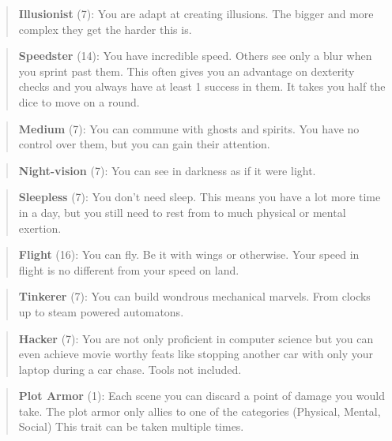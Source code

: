 \documentclass[11pt]{article}
\begin{document}
{\begin{multicols}{2}[]
\begin{quote}
\textbf{Illusionist} (7): You are adapt at creating illusions. The bigger and more complex they get the harder this is.
\end{quote}

\begin{quote}
\textbf{Speedster} (14): You have incredible speed. Others see only a blur when you sprint past them. This often gives you an advantage on dexterity checks and you always have at least 1 success in them. It takes you half the dice to move on a round.
\end{quote}

\begin{quote}
\textbf{Medium} (7): You can commune with ghosts and spirits. You have no control over them, but you can gain their attention.
\end{quote}

\begin{quote}
\textbf{Night-vision} (7): You can see in darkness as if it were light.
\end{quote}

\begin{quote}
\textbf{Sleepless} (7): You don't need sleep. This means you have a lot more time in a day, but you still need to rest from to much physical or mental exertion.
\end{quote}

\begin{quote}
\textbf{Flight} (16): You can fly. Be it with wings or otherwise. Your speed in flight is no different from your speed on land.
\end{quote}

\begin{quote}
\textbf{Tinkerer} (7): You can build wondrous mechanical marvels. From clocks up to steam powered automatons. 
\end{quote}

\begin{quote}
\textbf{Hacker} (7): You are not only proficient in computer science but you can even achieve movie worthy feats like stopping another car with only your laptop during a car chase. Tools not included.
\end{quote}

\begin{quote}
\textbf{Plot Armor} (1): Each scene you can discard a point of damage you would take. The plot armor only allies to one of the categories (Physical, Mental, Social) This trait can be taken multiple times.
\end{quote}


\end{multicols}}
\end{document}
